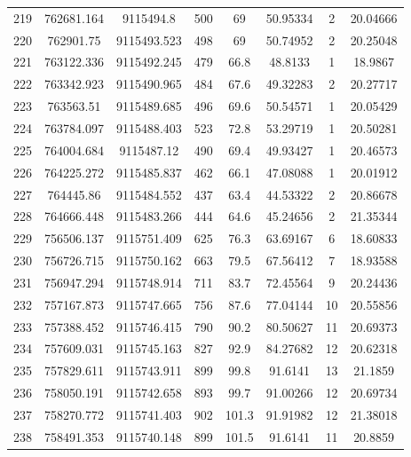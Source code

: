 \begin{longtable}{cccccccc}
219  & 762681.164      & 9115494.8        & 500     & 69    & 50.95334 & 2  & 20.04666 \\
220  & 762901.75       & 9115493.523      & 498     & 69    & 50.74952 & 2  & 20.25048 \\
221  & 763122.336      & 9115492.245      & 479     & 66.8  & 48.8133  & 1  & 18.9867  \\
222  & 763342.923      & 9115490.965      & 484     & 67.6  & 49.32283 & 2  & 20.27717 \\
223  & 763563.51       & 9115489.685      & 496     & 69.6  & 50.54571 & 1  & 20.05429 \\
224  & 763784.097      & 9115488.403      & 523     & 72.8  & 53.29719 & 1  & 20.50281 \\
225  & 764004.684      & 9115487.12       & 490     & 69.4  & 49.93427 & 1  & 20.46573 \\
226  & 764225.272      & 9115485.837      & 462     & 66.1  & 47.08088 & 1  & 20.01912 \\
227  & 764445.86       & 9115484.552      & 437     & 63.4  & 44.53322 & 2  & 20.86678 \\
228  & 764666.448      & 9115483.266      & 444     & 64.6  & 45.24656 & 2  & 21.35344 \\
229  & 756506.137      & 9115751.409      & 625     & 76.3  & 63.69167 & 6  & 18.60833 \\
230  & 756726.715      & 9115750.162      & 663     & 79.5  & 67.56412 & 7  & 18.93588 \\
231  & 756947.294      & 9115748.914      & 711     & 83.7  & 72.45564 & 9  & 20.24436 \\
232  & 757167.873      & 9115747.665      & 756     & 87.6  & 77.04144 & 10 & 20.55856 \\
233  & 757388.452      & 9115746.415      & 790     & 90.2  & 80.50627 & 11 & 20.69373 \\
234  & 757609.031      & 9115745.163      & 827     & 92.9  & 84.27682 & 12 & 20.62318 \\
235  & 757829.611      & 9115743.911      & 899     & 99.8  & 91.6141  & 13 & 21.1859  \\
236  & 758050.191      & 9115742.658      & 893     & 99.7  & 91.00266 & 12 & 20.69734 \\
237  & 758270.772      & 9115741.403      & 902     & 101.3 & 91.91982 & 12 & 21.38018 \\
238  & 758491.353      & 9115740.148      & 899     & 101.5 & 91.6141  & 11 & 20.8859  \\

\end{longtable}
